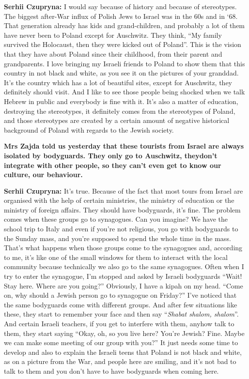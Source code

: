 \textbf{Serhii Czupryna:} I would say because of history and because of stereotypes. The biggest after-War influx of Polish Jews to Israel was in the 60s and in ‘68. That generation already has kids and grand-children, and probably a lot of them have never been to Poland except for Auschwitz. They think, ``My family survived the Holocaust, then they were kicked out of Poland''. This is the vision that they have about Poland since their childhood, from their parent and grandparents. I love bringing my Israeli friends to Poland to show them that this country in not black and white, as you see it on the pictures of your granddad. It’s the country which has a lot of beautiful sites, except for Auschwitz, they definitely should visit. And I like to see those people being shocked when we talk Hebrew in public and everybody is fine with it. It’s also a matter of education, destroying the stereotypes, it definitely comes from the stereotypes of Poland, and those stereotypes are created by a certain amount of negative historical background of Poland with regards to the Jewish society.\par
\textbf{Mrs Zajda told us yesterday that these tourists from Israel are always isolated by bodyguards. They only go to Auschwitz,  theydon’t integrate with other people, so they can’t even get to know our culture, our behaviour.}\par
\textbf{Serhii Czupryna:} It’s true. Because of the fact that most tours from Israel are organised with the help of certain ministries, the ministry of education or the ministry of foreign affairs. They should have bodyguards, it’s fine. The problem comes when these groups go to synagogues. Can you imagine? We have the school trip to Italy and even if you’re not religious, you go with bodyguards to the Sunday mass, and you’re supposed to spend the whole time in the mass. That’s what happens when those groups come to the synagogues and, according to me, it’s like one of the small windows for them to interact with the local community because technically we also go to the same synagogues. Often when I try to enter the synagogue, I’m stopped and asked by Israeli bodyguards ``Wait! Stay here. Where are you going?'' Obviously, I have a kipah on my head. ``Come on, why should a Jewish person go to synagogue on Friday?'' I’ve noticed that the same bodyguards come with different groups. And after few situations like these, they start to remember your face and then say ``\textit{Shabat shalom, shalom}''. And certain Israeli teachers, if you get to interfere with them, anyhow talk to them, they start saying ``Okay, oh, so you live here? You’re Jewish? Fine. Maybe we can make some meeting of our group with you?'' It just needs some time to develop and also to explain the Israeli teens that Poland is not black and white, as on a picture from the War, and people here are smiling, and it’s not bad to talk to them and you don’t have to have bodyguards when coming here.\par
